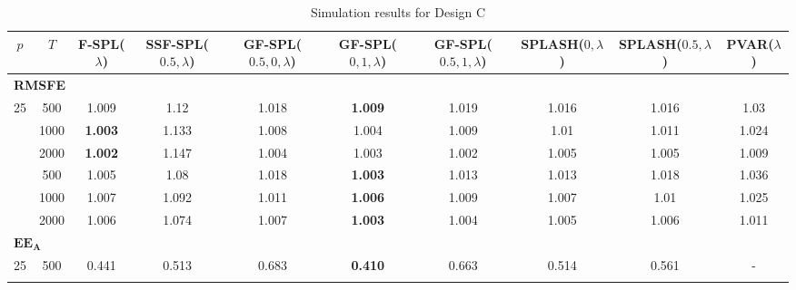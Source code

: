 \begin{landscape}
    \bgroup
    \def\arraystretch{1.3}
    \begin{table}[p]
    \footnotesize
    \centering
    \caption{Simulation results for Design C}
    \label{tab:results_designC}
    \begin{tabular}{cccccccccc}    
    \hline \hline
    $p$  &  $T$   &  F-SPL($\lambda$)  & SSF-SPL($0.5, \lambda$)  &  GF-SPL($0.5, 0, \lambda$)  &  GF-SPL($0, 1, \lambda$)  &  GF-SPL($0.5, 1, \lambda$)  &  SPLASH($0, \lambda$)  &  SPLASH($0.5, \lambda$)  &  PVAR($\lambda$)  \\
    \hline
    \multicolumn{10}{l}{\textbf{RMSFE}} \\
	\hline
	 25  & 500  & 1.009              &           1.12            &            1.018            & \textbf{1.009}            &            1.019            &         1.016          &          1.016           &       1.03        \\ \hdashline
	 25  & 1000 & \textbf{1.003}     &           1.133           &            1.008            & 1.004                     &            1.009            &          1.01          &          1.011           &       1.024       \\ \hdashline
	 25  & 2000 & \textbf{1.002}     &           1.147           &            1.004            & 1.003                     &            1.002            &         1.005          &          1.005           &       1.009       \\ \hdashline
	 36  & 500  & 1.005              &           1.08            &            1.018            & \textbf{1.003}            &            1.013            &         1.013          &          1.018           &       1.036       \\ \hdashline
	 36  & 1000 & 1.007              &           1.092           &            1.011            & \textbf{1.006}            &            1.009            &         1.007          &           1.01           &       1.025       \\ \hdashline
	 36  & 2000 & 1.006              &           1.074           &            1.007            & \textbf{1.003}            &            1.004            &         1.005          &          1.006           &       1.011       \\
	\hline
	\multicolumn{10}{l}{$\mathbf{EE_A}$} \\
	\hline
	 25  & 500  &       0.441        &           0.513           &            0.683            & \textbf{0.410}            &            0.663            & 0.514                  &          0.561           & -                 \\ \hdashline

\end{tabular}
\end{table}
\end{landscape}
